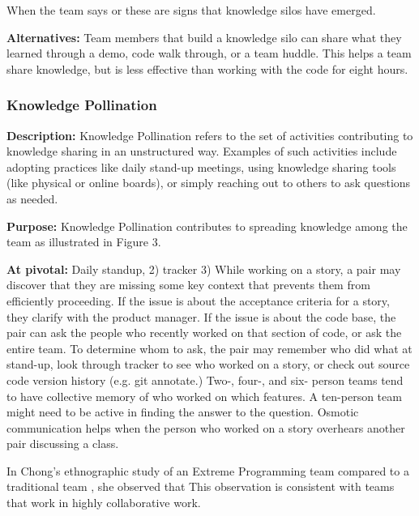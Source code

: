 \begin{table}[]
When the team says  or  these are signs that knowledge silos have emerged. 

\textbf{Alternatives:} Team members that build a knowledge silo can share what they learned through a demo, code walk through, or a team huddle. This helps a team share knowledge, but is less effective than working with the code for eight hours. 

\subsubsection{Knowledge Pollination}
\textbf{Description:} Knowledge Pollination refers to the set of activities contributing to knowledge sharing in an unstructured way. Examples of such activities include adopting practices like daily stand-up meetings, using knowledge sharing tools (like physical or online boards), or simply reaching out to others to ask questions as needed.

\textbf{Purpose:} Knowledge Pollination contributes to spreading knowledge among the team as illustrated in Figure 3.

\textbf{At pivotal:} 
Daily standup, 2) tracker
3) While working on a story, a pair may discover that they are missing some key context that prevents them from efficiently proceeding. If the issue is about the acceptance criteria for a story, they clarify with the product manager. If the issue is about the code base, the pair can ask the people who recently worked on that section of code, or ask the entire team.  To determine whom to ask, the pair may remember who did what at stand-up, look through tracker to see who worked on a story, or check out source code version history (e.g. git annotate.) Two-, four-, and six- person teams tend to have collective memory of who worked on which features. A ten-person team might need to be active in finding the answer to the question. Osmotic communication helps when the person who worked on a story overhears another pair discussing a class.

In Chong's ethnographic study of an Extreme Programming team compared to a traditional team \cite{ChongNominum}, she observed that  This observation is consistent with teams that work in highly collaborative work. 


\end{table}
